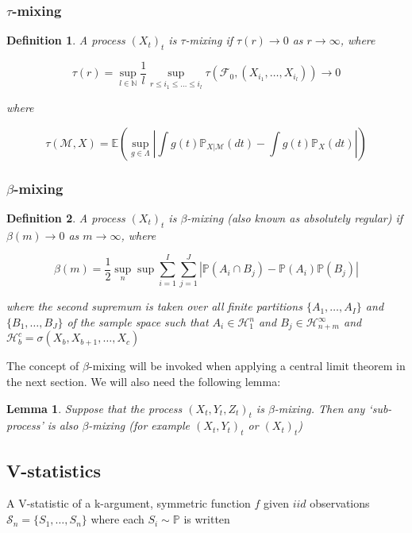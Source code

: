 \documentclass{article}
\newtheorem{definition}{Definition}
\newtheorem{lemma}{Lemma}
\begin{document}
\subsubsection{$\tau$-mixing}
\begin{definition}
A process $(X_t)_{t}$ is \emph{$\tau$-mixing} if $\tau(r) \longrightarrow 0$ as $r\longrightarrow \infty$, where

\[\tau(r) = \sup_{l\in \mathbb{N}} \frac{1}{l} \sup_{r\leq i_1 \leq \ldots \leq i_l} \tau(\mathcal{F}_0,(X_{i_1}, \ldots, X_{i_l})) \longrightarrow 0\]

where

\[ \tau(\mathcal{M},X) = \mathbb{E} (\sup_{g \in \Lambda} | \int g(t) \mathbb{P}_{X|\mathcal{M}}(dt) -  \int g(t) \mathbb{P}_{X}(dt) |)\]

\end{definition}

\subsubsection{$\beta$-mixing}


\begin{definition}
A process $(X_t)_{t}$ is \emph{$\beta$-mixing} (also known as \emph{absolutely regular}) if $\beta(m) \longrightarrow 0$ as $m\longrightarrow \infty$, where

\[ \beta(m) = \frac{1}{2} \sup_n \sup \sum_{i=1}^I \sum_{j=1}^J | \mathbb{P}(A_i \cap B_j) - \mathbb{P}(A_i)\mathbb{P}(B_j)| \]

where the second supremum is taken  over all finite partitions $\{A_1,\ldots, A_I \}$ and  $\{B_1,\ldots, B_J\}$ of the sample space such that $A_i \in \mathcal{H}_1^n$ and $B_j \in \mathcal{H}_{n+m}^\infty$ and $\mathcal{H}_b^c = \sigma(X_b,X_{b+1},\ldots,X_{c})$
\end{definition}

The concept of $\beta$-mixing will be invoked when applying a central limit theorem in the next section. We will also need the following lemma:

\begin{lemma}\label{lemma:beta}
Suppose that the process $(X_t,Y_t,Z_t)_t$ is $\beta$-mixing. Then any `sub-process' is also $\beta$-mixing (for example $(X_t,Y_t)_t$ or $(X_t)_t$)
\end{lemma}

\subsection{V-statistics}
A V-statistic of a k-argument, symmetric function $f$ given $iid$ observations $\mathcal{S}_n = \{S_1,\ldots,S_n\}$ where each $S_i \sim \mathbb{P}$ is written
\end{document}
